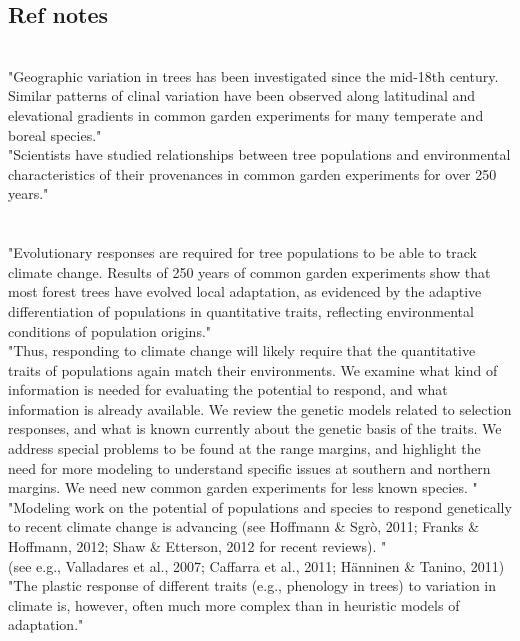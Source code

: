 \documentclass{article}
\begin{document}
\subsection*{Ref notes}

\citep{AitkenBemmels16}\\
"Geographic variation in trees has been investigated since the mid-18th century. Similar patterns of clinal variation have been observed along latitudinal and elevational gradients in common garden experiments for many temperate and boreal species."\\
"Scientists have studied relationships between tree populations and environmental characteristics of their provenances in common garden experiments for over 250 years."\\
\\
\citep{Alberto13}\\
"Evolutionary responses are required for tree populations to be able to track climate change. Results of 250 years of common garden experiments show that most forest trees have evolved local adaptation, as evidenced by the adaptive differentiation of populations in quantitative traits, reflecting environmental conditions of population origins."\\
"Thus, responding to climate change will likely require that the quantitative traits of populations again match their environments. We examine what kind of information is needed for evaluating the potential to respond, and what information is already available. We review the genetic models related to selection responses, and what is known currently about the genetic basis of the traits. We address special problems to be found at the range margins, and highlight the need for more modeling to understand specific issues at southern and northern margins. We need new common garden experiments for less known species. "\\
"Modeling work on the potential of populations and species to respond genetically to recent climate change is advancing (see Hoffmann \& Sgrò, 2011; Franks \& Hoffmann, 2012; Shaw \& Etterson, 2012 for recent reviews). "\\

(see e.g., Valladares et al., 2007; Caffarra et al., 2011; Hänninen \& Tanino, 2011)
"The plastic response of different traits (e.g., phenology in trees) to variation in climate is, however, often much more complex than in heuristic models of adaptation."\\
\end{document}
